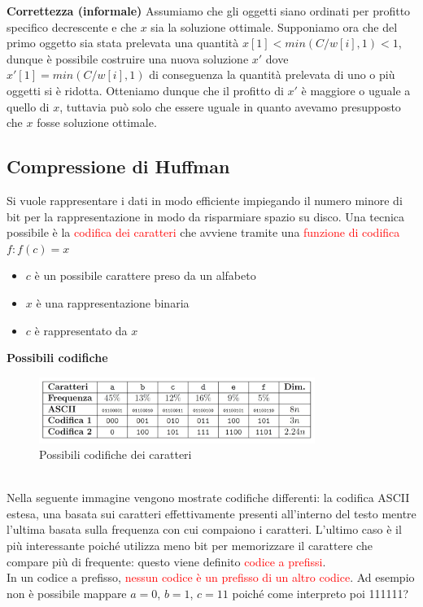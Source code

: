 \documentclass[../cheatSheetAlgoritmi.tex]{subfiles}
\begin{document}
\bigskip

\textbf{Correttezza (informale)}
Assumiamo che gli oggetti siano ordinati per profitto specifico decrescente e che $x$ sia la soluzione ottimale. Supponiamo ora che del primo oggetto sia stata prelevata una quantità $x[1] < min(C/w[i], 1) < 1$, dunque è possibile costruire una nuova soluzione $x'$ dove $x'[1] = min(C/w[i], 1)$ di conseguenza la quantità prelevata di uno o più oggetti si è ridotta. Otteniamo dunque che il profitto di $x'$ è maggiore o uguale a quello di $x$, tuttavia può solo che essere uguale in quanto avevamo presupposto che $x$ fosse soluzione ottimale.
\subsection{Compressione di Huffman}
Si vuole rappresentare i dati in modo efficiente impiegando il numero minore di bit per la rappresentazione in modo da risparmiare spazio su disco. Una tecnica possibile è la \textcolor{red}{codifica dei caratteri} che avviene tramite una \textcolor{red}{funzione di codifica} $f : f(c) = x$
\begin{itemize}
	\item $c$ è un possibile carattere preso da un alfabeto
	\item $x$ è una rappresentazione binaria
	\item $c$ è rappresentato da $x$
\end{itemize}
\textbf{Possibili codifiche}
\begin{figure}[h]
\centering
\includegraphics[width=0.8\textwidth]{../img/Greedy_1.jpg}
\caption{Possibili codifiche dei caratteri}
\end{figure} \\
Nella seguente immagine vengono mostrate codifiche differenti: la codifica ASCII estesa, una basata sui caratteri effettivamente presenti all'interno del testo mentre l'ultima basata sulla frequenza con cui compaiono i caratteri. L'ultimo caso è il più interessante poiché utilizza meno bit per memorizzare il carattere che compare più di frequente: questo viene definito \textcolor{red}{codice a prefissi}.\\
In un codice a prefisso, \textcolor{red}{nessun codice è un prefisso di un altro codice}. Ad esempio non è possibile mappare $a = 0$, $b = 1$, $c = 11$ poiché come interpreto poi 111111?
\end{document}
